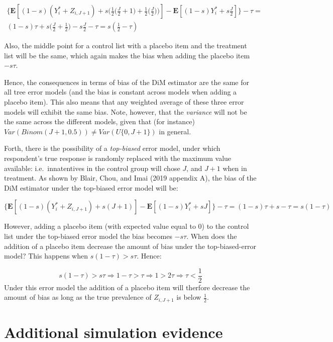 \documentclass[]{article}
\begin{document}
\[
\begin{aligned}
\bigg\{ \mathbf{E} \left[ (1-s)(Y^*_{i} + Z_{i, J+1}) + s\bigg(\frac{1}{2} \bigg(\frac{J}{2}+1 \bigg) + \frac{1}{2} \bigg(\frac{J}{2} \bigg) \bigg)  \right] - \mathbf{E} \left[ (1-s)Y^*_{i} + s \frac{J}{2} \right] \bigg\} - \tau = \\ (1-s) \tau + s \bigg(\frac{J}{2} + \frac{1}{2} \bigg) - s \frac{J}{2} - \tau = s \left(\frac{1}{2} - \tau \right)
\end{aligned}
\]

Also, the middle point for a control list with a placebo item and the
treatment list will be the same, which again makes the bias when adding
the placebo item \(-s\tau\).

Hence, the consequences in terms of bias of the DiM estimator are the
same for all tree error models (and the bias is constant across models
when adding a placebo item). This also means that any weighted average
of these three error models will exhibit the same bias. Note, however,
that the \emph{variance} will not be the same across the different
models, given that (for instance)
\(Var(Binom(J+1, 0.5)) \neq Var(U\{0,J+1\})\) in general.

Forth, there is the possibility of a \emph{top-biased} error model,
under which respondent's true response is randomly replaced with the
maximum value available: i.e.~innatentives in the control group will
chose \(J\), and \(J+1\) when in treatment. As shown by Blair, Chou, and
Imai (2019 appendix A), the bias of the DiM estimator under the
top-biased error model will be:

\[
\bigg\{ \mathbf{E} \left[ (1-s)(Y^*_{i} + Z_{i, J+1}) + s(J+1) \right] - \mathbf{E} \left[ (1-s)Y^*_{i} + sJ \right] \bigg\} - \tau = (1-s) \tau + s - \tau = s(1 - \tau)
\]

However, adding a placebo item (with expected value equal to 0) to the
control list under the top-biased error model the bias becomes
\(-s\tau\). When does the addition of a placebo item decrease the amount
of bias under the top-biased-error model? This happens when
\(s \left(1 - \tau \right) > s \tau\). Hence:

\[
s \left(1 - \tau \right) > s \tau \Rightarrow 1 - \tau  > \tau \Rightarrow 1 > 2 \tau \Rightarrow \tau < \frac{1}{2}
\] Under this error model the addition of a placebo item will therfore
decrease the amount of bias as long as the true prevalence of
\(Z_{i, J+1}\) is below \(\frac{1}{2}\).

\hypertarget{additional-simulation-evidence}{%
\section{Additional simulation
evidence}\label{additional-simulation-evidence}}
\end{document}
